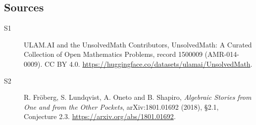 \documentclass[11pt]{article}
\begin{document}
\subsection{Sources}
\begin{description}
\item[\hypertarget{source:1500009:1}{S1}] ULAM.AI and the UnsolvedMath Contributors, UnsolvedMath: A Curated Collection of Open Mathematics Problems, record 1500009 (AMR-014-0009). CC BY 4.0. \url{https://huggingface.co/datasets/ulamai/UnsolvedMath}.
\item[\hypertarget{source:1500009:2}{S2}] R. Fröberg, S. Lundqvist, A. Oneto and B. Shapiro, \emph{Algebraic Stories from One and from the Other Pockets}, arXiv:1801.01692 (2018), §2.1, Conjecture 2.3. \url{https://arxiv.org/abs/1801.01692}.
\end{description}
\label{end:1500009}
\end{document}
